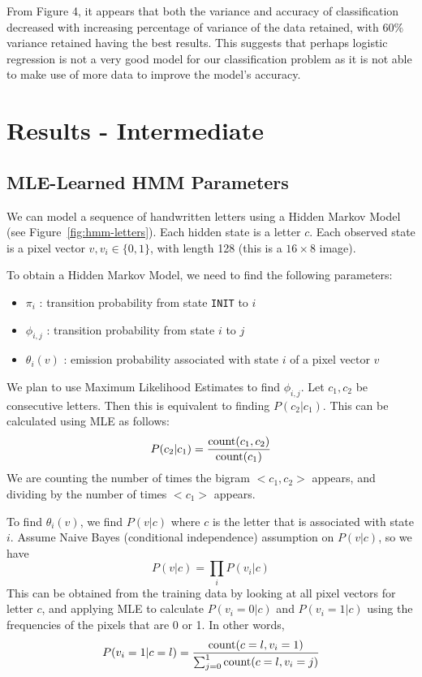 \documentclass{article} %
\begin{document}
From Figure 4, it appears that both the variance and accuracy of classification decreased with increasing percentage of variance of the data retained, with 60\% variance retained having the best results. This suggests that perhaps logistic regression is not a very good model for our classification problem as it is not able to make use of more data to improve the model's accuracy.

\section{Results - Intermediate}

\subsection{MLE-Learned HMM Parameters}

We can model a sequence of handwritten letters using a Hidden Markov Model (see Figure~\ref{fig:hmm-letters}). Each hidden state is a letter $c$. Each observed state is a pixel vector $v, v_i \in \{0,1\}$, with length 128 (this is a $16 \times 8$ image). 

To obtain a Hidden Markov Model, we need to find the following parameters:
\begin{itemize}
	\item $\pi_i$ : transition probability from state \texttt{INIT} to $i$
	\item $\phi_{i,j}$ : transition probability from state $i$ to $j$
	\item $\theta_{i}(v)$ : emission probability associated with state $i$ of a pixel vector $v$
\end{itemize}

We plan to use Maximum Likelihood Estimates to find $\phi_{i,j}$. Let $c_1, c_2$ be consecutive letters. Then this is equivalent to finding $P(c_2 | c_1)$. This can be calculated using MLE as follows:
$$ P(c_2 | c_1) = \frac{\mbox{count}(c_1, c_2)}{\mbox{count}(c_1)}$$
We are counting the number of times the bigram $<c_1, c_2>$ appears, and dividing by the number of times $<c_1>$ appears.

To find $\theta_{i}(v)$, we find $P(v | c)$ where $c$ is the letter that is associated with state $i$. Assume Naive Bayes (conditional independence) assumption on $P(v | c)$, so we have 
$$ P(v | c) = \prod_i P(v_i | c)$$
This can be obtained from the training data by looking at all pixel vectors for letter $c$, and applying MLE to calculate $P(v_i = 0 | c)$ and $P(v_i = 1 | c)$ using the frequencies of the pixels that are 0 or 1. In other words,
$$ P(v_i = 1 | c = l) = \frac{\mbox{count}(c = l, v_i = 1)}{\sum_{j=0}^1 \mbox{count}(c = l, v_i = j)}$$
\end{document}
